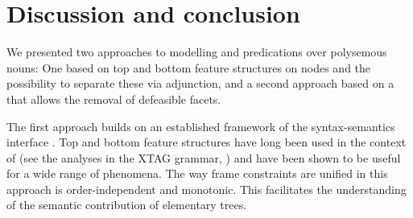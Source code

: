\documentclass[output=paper,colorlinks,citecolor=brown,chinesefont]{langscibook}
\begin{document}




\section{Discussion and conclusion}

We presented two approaches to modelling  and  predications over polysemous nouns: One based on top and bottom feature structures on nodes and the possibility to separate these via adjunction, and a second approach based on a  that allows the removal of defeasible facets.

The first approach builds on an established framework of the syntax-semantics interface \citep{kallmeyer2013syntax,chen2022frame}. Top and bottom feature structures have long been used in the context of  (see the analyses in the XTAG grammar, \citealp{XTAG:01}) and have been shown to be useful for a wide range of phenomena. The way frame constraints are unified in this approach is order-independent and monotonic. This facilitates the understanding of the semantic contribution of elementary trees.
\end{document}
